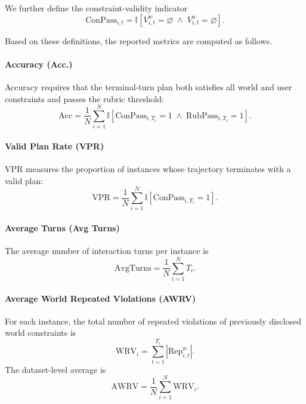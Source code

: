 We further define the constraint-validity indicator
\begin{equation}
\mathrm{ConPass}_{i,t}
=
\mathbb{I}\!\left[
V_{i,t}^w = \varnothing \;\wedge\; V_{i,t}^u = \varnothing
\right].
\end{equation}

Based on these definitions, the reported metrics are computed as follows.

\paragraph{Accuracy (Acc.)}
Accuracy requires that the terminal-turn plan both satisfies all world and user constraints
and passes the rubric threshold:
\begin{equation}
\mathrm{Acc}
=
\frac{1}{N}\sum_{i=1}^{N}
\mathbb{I}\!\left[
\mathrm{ConPass}_{i,T_i}=1
\;\wedge\;
\mathrm{RubPass}_{i,T_i}=1
\right].
\end{equation}

\paragraph{Valid Plan Rate (VPR)}
VPR measures the proportion of instances whose trajectory terminates with a valid plan:
\begin{equation}
\mathrm{VPR}
=
\frac{1}{N}\sum_{i=1}^{N}
\mathbb{I}\!\left[
\mathrm{ConPass}_{i,T_i}=1
\right].
\end{equation}

\paragraph{Average Turns (Avg Turns)}
The average number of interaction turns per instance is
\begin{equation}
\mathrm{AvgTurns}
=
\frac{1}{N}\sum_{i=1}^{N} T_i.
\end{equation}

\paragraph{Average World Repeated Violations (AWRV)}
For each instance, the total number of repeated violations of previously disclosed world constraints is
\begin{equation}
\mathrm{WRV}_i
=
\sum_{t=1}^{T_i} \left| \mathrm{Rep}_{i,t}^w \right|.
\end{equation}
The dataset-level average is
\begin{equation}
\mathrm{AWRV}
=
\frac{1}{N}\sum_{i=1}^{N} \mathrm{WRV}_i.
\end{equation}

